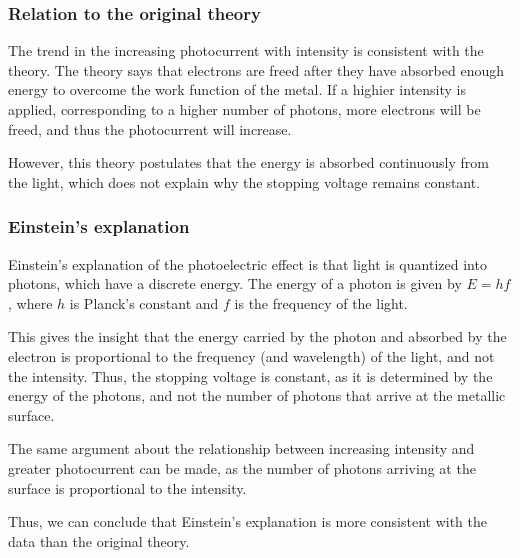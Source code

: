 \subsubsection{Relation to the original theory}

The trend in the increasing photocurrent with intensity is consistent with the theory.
The theory says that electrons are freed after they have absorbed enough energy to overcome the work function of the metal.
If a highier intensity is applied, corresponding to a higher number of photons, more electrons will be freed, and thus the photocurrent will increase.

However, this theory postulates that the energy is absorbed continuously from the light, which does not explain why the stopping voltage remains constant.

\subsubsection{Einstein's explanation}

Einstein's explanation of the photoelectric effect is that light is quantized into photons, which have a discrete energy.
The energy of a photon is given by $E = hf$, where $h$ is Planck's constant and $f$ is the frequency of the light.

This gives the insight that the energy carried by the photon and absorbed by the electron is proportional to the frequency (and wavelength) of the light, and not the intensity.
Thus, the stopping voltage is constant, as it is determined by the energy of the photons, and not the number of photons that arrive at the metallic surface.

The same argument about the relationship between increasing intensity and greater photocurrent can be made, as the number of photons arriving at the surface is proportional to the intensity.

Thus, we can conclude that Einstein's explanation is more consistent with the data than the original theory.

